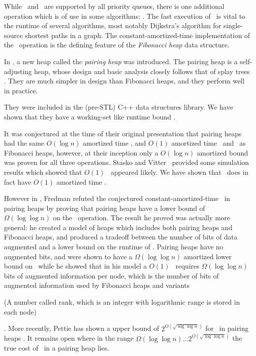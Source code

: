 While \opIns\ and \opEm\ are supported by all priority queues, there is one additional operation which is of use in some algorithms: \opDc. The fast execution of \opDc\ is vital to the runtime of several algorithms, most notably Dijkstra's algorithm \cite{springerlink:10.1007/BF01386390} for single-source shortest paths in a graph. The constant-amortized-time implementation of the \opDc\ operation is the defining feature of the \emph{Fibonacci heap} \cite{DBLP:journals/jacm/FredmanT87} data structure. 

In \cite{DBLP:journals/algorithmica/FredmanSST86}, a new heap called the \emph{pairing heap} was introduced. The pairing heap is a self-adjusting heap, whose design and basic analysis closely follows that of splay trees \cite{DBLP:journals/jacm/SleatorT85}. They are much simpler in design than Fibonacci heaps, and they perform well in practice.
\begin{fullonly}
 They were included in the (pre-STL) C++ data structures library. We have shown that they have a working-set like runtime bound \cite{DBLP:conf/swat/Iacono00}. 
\end{fullonly}

It was conjectured at the time of their original presentation that pairing heaps had the same $O(\log n)$ amortized time \opEm, and $O(1)$ amortized time \opIns\ and \opDc\ as Fibonacci heaps, however, at their inception only a $O(\log n)$ amortized bound was proven for all three operations. Stasko and Vitter~\cite{DBLP:journals/cacm/StaskoV87} provided some simulation results which showed that $O(1)$ \opDc\ appeared likely. We have shown that \opIns\ does in fact have $O(1)$ amortized time \cite{DBLP:journals/corr/abs-1110-4428,DBLP:conf/swat/Iacono00}. 

However in \cite{DBLP:journals/jacm/Fredman99}, Fredman refuted the conjectured constant-amortized-time \opDc\ in pairing heaps by proving that pairing heaps have a lower bound of $\Omega(\log \log n)$ on the \opDc\ operation. The result he proved was actually more general: he created a model of heaps which includes both pairing heaps and Fibonacci heaps, and produced a tradeoff between the number of bits of data augmented and a lower bound on the runtime of \opDc. Pairing heaps have no augmented bits, and were shown to have a $\Omega(\log \log n)$ amortized lower bound on \opDc\ while he showed that in his model a $O(1)$ \opDc\ requires $\Omega(\log \log n)$ bits of augmented information per node, which is the number of bits of augmented information used by Fibonacci heaps and variants\begin{fullonly}
 (A number called rank, which is an integer with logarithmic range is stored in each node)\end{fullonly}
 . More recently, Pettie has shown a upper bound of $2^{O(\sqrt{\log \log n})}$  for \opDc\ in pairing heaps \cite{DBLP:conf/focs/Pettie05}. It remains open where in the range $\Omega(\log \log n) \ldots 2^{O(\sqrt{\log \log n})}$ the true cost of \opDc\ in a pairing heap lies.

